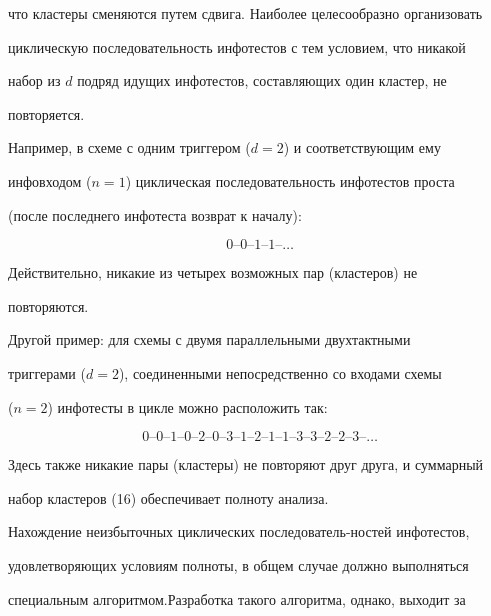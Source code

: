 что кластеры сменяются путем сдвига. Наиболее целесообразно организовать 


циклическую последовательность инфотестов с тем условием, что никакой 


набор из $d$ подряд идущих инфотестов, составляющих один кластер, не 


повторяется.





Например, в схеме с одним триггером ($d = 2$) и соответствующим ему 


инфовходом ($n = 1$) циклическая последовательность инфотестов проста 


(после последнего инфотеста возврат к началу):


$$


0\mbox{--}0\mbox{--}1\mbox{--}1\mbox{--}\ldots


$$





Действительно, никакие из четырех возможных пар (кластеров) не 


повторяются.





Другой пример: для схемы с двумя параллельными двухтактными 


триггерами ($d = 2$), соединенными непосредственно со входами схемы 


($n = 2$) инфотесты в цикле можно расположить так:


$$


0\mbox{--}0\mbox{--}1\mbox{--}0\mbox{--}2\mbox{--}0\mbox{--}3\mbox{--}1\mbox{--}2\mbox{--}1\mbox{--}1\mbox{--}3\mbox{--}3\mbox{--}2\mbox{--}2\mbox{--}3\mbox{--}\ldots


$$





Здесь также никакие пары (кластеры) не повторяют друг друга, и суммарный 


набор кластеров (16) обеспечивает полноту анализа.





Нахождение неизбыточных циклических последователь-\linebreak ностей инфотестов, 


удовлетворяющих условиям полноты, в общем случае должно выполняться 


специальным алгоритмом.\linebreak Разработка такого алгоритма, однако, выходит за 


